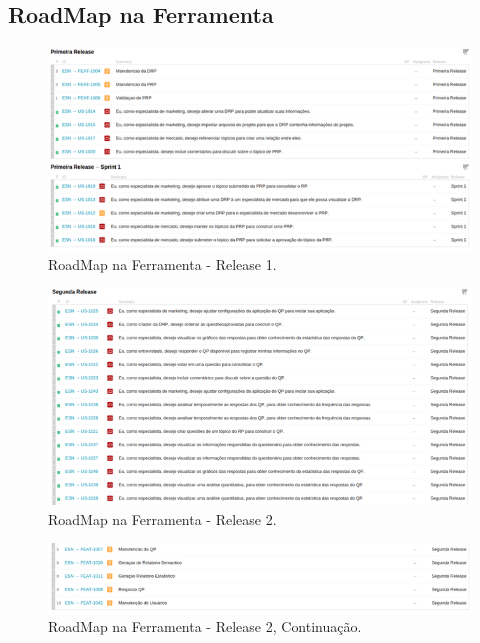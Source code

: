 	\subsection{RoadMap na Ferramenta}

	\begin{landscape}
		\begin{figure}[h]
		\vspace*{11mm}
		\centering
		\includegraphics{imagens/roadmapf1.png}
		\caption{RoadMap na Ferramenta - Release 1.}
		\label{imagem}
	\end{figure}
	\end{landscape}

	\vspace*{-5mm}
	\begin{figure}[!htp]
		\vspace*{11mm}
		\centering
		\includegraphics{imagens/roadmapf2.png}
		\caption{RoadMap na Ferramenta - Release 2.}
		\label{imagem}
	\end{figure}
	
	\begin{figure}[!htp]
		\vspace*{11mm}
		\centering
		\includegraphics{imagens/roadmapf3.png}
		\caption{RoadMap na Ferramenta - Release 2, Continuação.}
		\label{imagem}
	\end{figure}